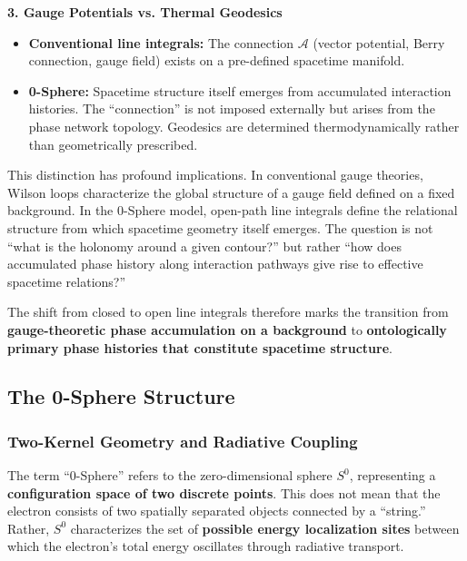 \documentclass[12pt,letterpaper]{article}
\begin{document}
\textbf{3. Gauge Potentials vs. Thermal Geodesics}
\begin{itemize}
\item \textbf{Conventional line integrals:} The connection $\mathcal{A}$ (vector potential, Berry connection, gauge field) exists on a pre-defined spacetime manifold.
\item \textbf{0-Sphere:} Spacetime structure itself emerges from accumulated interaction histories. The ``connection'' is not imposed externally but arises from the phase network topology. Geodesics are determined thermodynamically rather than geometrically prescribed.
\end{itemize}

This distinction has profound implications. In conventional gauge theories, Wilson loops characterize the global structure of a gauge field defined on a fixed background. In the 0-Sphere model, open-path line integrals define the relational structure from which spacetime geometry itself emerges. The question is not ``what is the holonomy around a given contour?'' but rather ``how does accumulated phase history along interaction pathways give rise to effective spacetime relations?''

The shift from closed to open line integrals therefore marks the transition from \textbf{gauge-theoretic phase accumulation on a background} to \textbf{ontologically primary phase histories that constitute spacetime structure}.


\subsection{The 0-Sphere Structure}
\label{subsec:0sphere_structure}

\subsubsection{Two-Kernel Geometry and Radiative Coupling}
\label{subsubsec:two_kernel}

The term ``0-Sphere'' refers to the zero-dimensional sphere $S^0$, representing a \textbf{configuration space of two discrete points}. This does not mean that the electron consists of two spatially separated objects connected by a ``string.'' Rather, $S^0$ characterizes the set of \textbf{possible energy localization sites} between which the electron's total energy oscillates through radiative transport.
\end{document}
